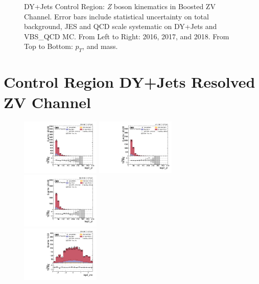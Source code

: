 \begin{figure}[!ht]
  \caption[DY+Jets Control Region: \textit{Z} boson kinematics in Boosted ZV Channel]%
  {DY+Jets Control Region: \textit{Z} boson kinematics in Boosted ZV Channel.
    Error bars include statistical uncertainty on total background,
    JES and QCD scale systematic on DY+Jets and VBS\_QCD MC\@. From Left to Right: 2016,
    2017, and 2018. From Top to Bottom: \( p_T \), and mass.}%
  \label{fig:zv-cr-vjets-l-v-lep-pt-m}
\end{figure}

\clearpage
\section{
  Control Region DY+Jets Resolved ZV Channel
 }

\begin{figure}[!ht]
  \centering
  \includegraphics[width=0.335\textwidth]{analysis_plots/2016_zjj/cr_vjets_e/lep2_pt.pdf} \hspace{-10pt}
  \includegraphics[width=0.335\textwidth]{analysis_plots/2017_zjj/cr_vjets_e/lep2_pt.pdf} \hspace{-10pt}
  \includegraphics[width=0.335\textwidth]{analysis_plots/2018_zjj/cr_vjets_e/lep2_pt.pdf} \hspace{-10pt} \\
  \includegraphics[width=0.335\textwidth]{analysis_plots/2016_zjj/cr_vjets_e/lep2_eta.pdf} \hspace{-10pt}

\end{figure}
